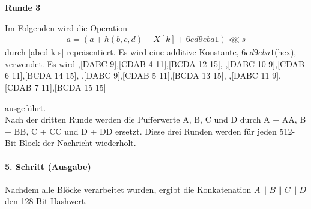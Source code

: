 \documentclass[12pt,a4paper]{scrartcl}
\newcommand{\spar}{\par\vspace{10pt}\noindent}
\numberwithin{equation}{section}
\numberwithin{myalgctr}{section}
\numberwithin{mytheoremctr}{section}
\newcommand{\mpar}[1]{\paragraph*{#1}\mbox{}\par}
\begin{document}
	
	\noindent \textbf{Runde 3}\par\noindent
	Im Folgenden wird die Operation 
	\begin{align}
	a = (a + h(b,c,d) + X[k] + 6ed9eba1)\lll s
	\end{align}
	durch [abcd k s] repräsentiert. Es wird eine additive Konstante, $6ed9eba1$(hex), verwendet. Es wird
	\vspace{.5cm}
	\newline
	[ABCD 0 3],\hfill [DABC \: 9],\hfill [CDAB 4 11],\hfill [BCDA 12 15],
	\newline
	[ABCD 2 3],\hfill [DABC 10 9],\hfill [CDAB 6 11],\hfill [BCDA 14 15],
	\newline
	[ABCD 1 3],\hfill [DABC \: 9],\hfill [CDAB 5 11],\hfill [BCDA 13 15],
	\newline
	[ABCD 3 3],\hfill [DABC 11 9],\hfill [CDAB 7 11],\hfill [BCDA 15 15]\:
	\spar
	ausgeführt.\\
	\vspace{.5cm}
\noindent
	Nach der dritten Runde werden die Pufferwerte A, B, C und D durch A + AA, B + BB, C + CC und D + DD ersetzt. Diese drei Runden werden für jeden 512-Bit-Block der Nachricht wiederholt. \autocite[vgl.][S. 4 f.]{rivest}
	
	\mpar{5. Schritt (Ausgabe)}\noindent
	Nachdem alle Blöcke verarbeitet wurden, ergibt die Konkatenation $A\parallel B\parallel C\parallel D$ den 128-Bit-Hashwert.
	
\end{document}

